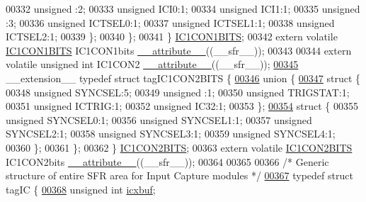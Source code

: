 \begin{DoxyCode}
00332       \textcolor{keywordtype}{unsigned} :2;
00333       \textcolor{keywordtype}{unsigned} ICI0:1;
00334       \textcolor{keywordtype}{unsigned} ICI1:1;
00335       \textcolor{keywordtype}{unsigned} :3;
00336       \textcolor{keywordtype}{unsigned} ICTSEL0:1;
00337       \textcolor{keywordtype}{unsigned} ICTSEL1:1;
00338       \textcolor{keywordtype}{unsigned} ICTSEL2:1;
00339     \};
00340   \};
00341 \} \hyperlink{a00014_d5/d5f/a00461}{IC1CON1BITS};
00342 \textcolor{keyword}{extern} \textcolor{keyword}{volatile} \hyperlink{a00014_d5/d5f/a00461}{IC1CON1BITS} IC1CON1bits \hyperlink{a00015_a493c46f03454991ccc5aa7a6e1dfb2a7}{\_\_attribute\_\_}((\_\_sfr\_\_));
00343 
00344 \textcolor{keyword}{extern} \textcolor{keyword}{volatile} \textcolor{keywordtype}{unsigned} \textcolor{keywordtype}{int}  IC1CON2 \hyperlink{a00015_a493c46f03454991ccc5aa7a6e1dfb2a7}{\_\_attribute\_\_}((\_\_sfr\_\_));
\hypertarget{a00015_source_l00345}{}\hyperlink{a00014}{00345} \_\_extension\_\_ \textcolor{keyword}{typedef} \textcolor{keyword}{struct }tagIC1CON2BITS \{
\hypertarget{a00015_source_l00346}{}\hyperlink{a00015}{00346}   \textcolor{keyword}{union }\{
\hypertarget{a00015_source_l00347}{}\hyperlink{a00015}{00347}     \textcolor{keyword}{struct }\{
00348       \textcolor{keywordtype}{unsigned} SYNCSEL:5;
00349       \textcolor{keywordtype}{unsigned} :1;
00350       \textcolor{keywordtype}{unsigned} TRIGSTAT:1;
00351       \textcolor{keywordtype}{unsigned} ICTRIG:1;
00352       \textcolor{keywordtype}{unsigned} IC32:1;
00353     \};
\hypertarget{a00015_source_l00354}{}\hyperlink{a00015}{00354}     \textcolor{keyword}{struct }\{
00355       \textcolor{keywordtype}{unsigned} SYNCSEL0:1;
00356       \textcolor{keywordtype}{unsigned} SYNCSEL1:1;
00357       \textcolor{keywordtype}{unsigned} SYNCSEL2:1;
00358       \textcolor{keywordtype}{unsigned} SYNCSEL3:1;
00359       \textcolor{keywordtype}{unsigned} SYNCSEL4:1;
00360     \};
00361   \};
00362 \} \hyperlink{a00014_d2/d9d/a00464}{IC1CON2BITS};
00363 \textcolor{keyword}{extern} \textcolor{keyword}{volatile} \hyperlink{a00014_d2/d9d/a00464}{IC1CON2BITS} IC1CON2bits \hyperlink{a00015_a493c46f03454991ccc5aa7a6e1dfb2a7}{\_\_attribute\_\_}((\_\_sfr\_\_));
00364 
00365 
00366 \textcolor{comment}{/* Generic structure of entire SFR area for Input Capture modules */}
\hypertarget{a00015_source_l00367}{}\hyperlink{a00014}{00367} \textcolor{keyword}{typedef} \textcolor{keyword}{struct }tagIC \{
\hypertarget{a00015_source_l00368}{}\hyperlink{a00014_ae557d410aa679e2ba67204aeb7566392}{00368}         \textcolor{keywordtype}{unsigned} \textcolor{keywordtype}{int} \hyperlink{a00014_ae557d410aa679e2ba67204aeb7566392}{icxbuf};

\end{DoxyCode}
